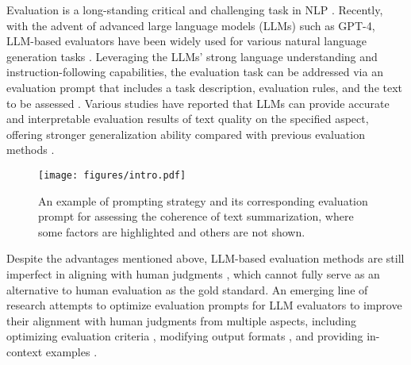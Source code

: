 
Evaluation is a long-standing critical and challenging task in NLP \cite{celikyilmaz2020evaluation, chang2024survey}.
Recently, with the advent of advanced large language models (LLMs) such as GPT-4, LLM-based evaluators have been widely used for various natural language generation tasks \cite{wang-etal-2023-chatgpt, liu-etal-2023-g, zheng2023judging, hu-etal-2024-llm}. 
Leveraging the LLMs' strong language understanding and instruction-following capabilities, the evaluation task can be addressed via an evaluation prompt that includes a task description, evaluation rules, and the text to be assessed
\cite{chen-etal-2023-exploring-use, ke-etal-2023-decompeval}. 
Various studies have reported that LLMs can provide accurate and interpretable evaluation results of text quality
on the specified aspect, offering stronger generalization ability compared with previous evaluation methods \cite{papineni-etal-2002-bleu, lin-2004-rouge, bert-score, zhong-etal-2022-towards}.

\begin{figure}[t]
\scriptsize
    \centering
    \texttt{[image: figures/intro.pdf]}
    \vspace{-4mm}
    \caption{An example of prompting strategy and its corresponding evaluation prompt for assessing the coherence of text summarization, where some factors are highlighted and others are not shown.}
    \vspace{-6mm}
    \label{fig:example}
\end{figure}

Despite the advantages mentioned above, LLM-based evaluation methods are still imperfect in aligning with human judgments \cite{wang-etal-2023-chatgpt, liu2024aligning}, which cannot fully serve as an alternative to human evaluation as the gold standard. 
An emerging line of research attempts to optimize 
evaluation prompts for LLM evaluators to improve their alignment with human judgments from multiple aspects, including optimizing evaluation criteria \cite{liu-etal-2024-calibrating, liu-etal-2024-hd}, modifying output formats \cite{chiang-lee-2023-closer, chu2024better}, and providing in-context examples \cite{kim-etal-2023-better, jain-etal-2023-multi, huang2024empirical}.

